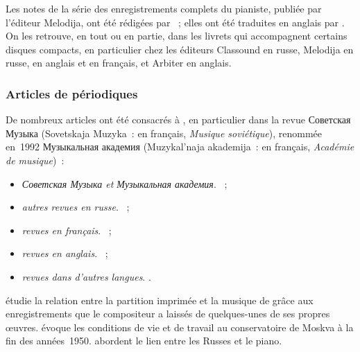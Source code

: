 Les notes de la série des enregistrements complets du pianiste, publiée par
l'éditeur Melodija, ont été rédigées par \citet{Nikonovich79}~; elles ont
été traduites en anglais par \citet[p.~\hbox{2-22}]{White}.
On les retrouve, en tout ou en partie, dans les livrets qui accompagnent
certains disques compacts, en particulier chez les éditeurs Classound en
russe, Melodija en russe, en anglais et en français, et Arbiter en anglais.

\subsubsection{Articles de périodiques}

De nombreux articles ont été consacrés à \VSofronitsky{}, en particulier
dans la revue \foreignlanguage{russian}{Советская Музыка} (Sovetskaja
Muzyka~: en français, \emph{Musique soviétique}), renommée en~1992
\foreignlanguage{russian}{Музыкальная академия} (Muzykal'naja akademija~:
en français, \emph{Académie de musique})~:
\begin{itemize}
 \item\emph{\foreignlanguage{russian}{Советская Музыка} et
 \foreignlanguage{russian}{Музыкальная академия}}.
 \citet{Adzhemov59, Adzhemov60, Adzhemov61, Barenboim47, Bashkirov61,
 Bogdanov65, Delson34, Gakkel72, Milshteyn51, Nikolaiev49, Nikonovich61,
 Nikonovich68a, Nikonovich68b, Nikonovich69, Nikonovich77, Paperno89a,
 Paperno89b, Paperno89c, Paperno89d, Paperno89e, Podolskaya60, Rabinovich57,
 Rabinovich58, Rabinovich60, Rabinovich61, Rabinovich61b, Savshinsky61,
 Sofronitsky46, Sofronitsky61}~;
 \item\emph{autres revues en russe}.
 \citet{Badeyan03, Barenboim45, Genn08, Piskounova}~;
 \item\emph{revues en français}.
 \citet{Cochard08a, Engerer, Lompech85a, Lompech85c, Lompech86, Macassar,
 Thomas84}~;
 \item\emph{revues en anglais}.
 \citet{Bowers59, Brown14, Juban, Leikin96, Lobanov91, Paperno84, Siepmann,
 Tassie, Young91, Zaltsberg}~;
 \item\emph{revues dans d'autres langues}.
 \citet{He12, Rattalino95, Schiavon, Sofronitskaya01, Voskobojnikov90,
 Voskobojnikov09a, Voskobojnikov09b}.
\end{itemize}

\citeauthor{Leikin96} étudie la relation entre la partition imprimée et la
musique de \Scriabine{} grâce aux enregistrements que le compositeur a
laissés de quelques-unes de ses propres œuvres.
\citeauthor{Bowers59} évoque les conditions de vie et de travail au
conservatoire de Moskva à la fin des années~1950.
\citeauthor{Engerer} abordent le lien entre les Russes et le piano.


